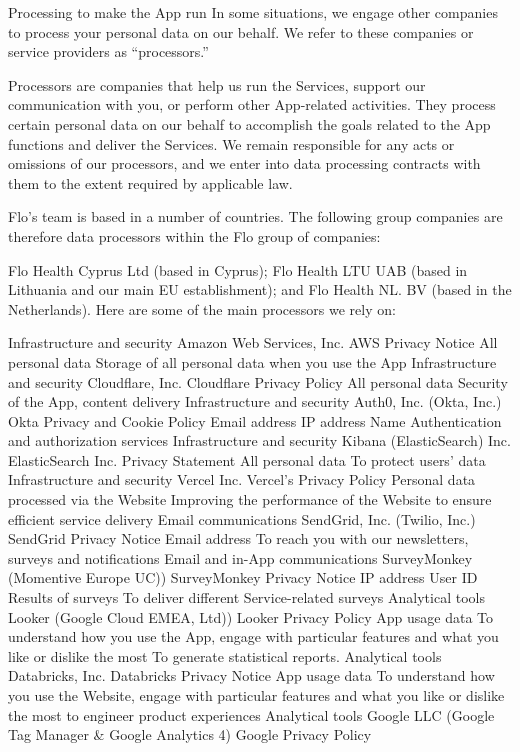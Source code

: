 Processing to make the App run 
In some situations, we engage other companies to process your personal data on our behalf. We refer to these companies or service providers as “processors.” 

Processors are companies that help us run the Services, support our communication with you, or perform other App-related activities. They process certain personal data on our behalf to accomplish the goals related to the App functions and deliver the Services. We remain responsible for any acts or omissions of our processors, and we enter into data processing contracts with them to the extent required by applicable law.

Flo’s team is based in a number of countries. The following group companies are therefore data processors within the Flo group of companies:

Flo Health Cyprus Ltd (based in Cyprus); 
Flo Health LTU UAB (based in Lithuania and our main EU establishment); and 
Flo Health NL. BV (based in the Netherlands).  
Here are some of the main processors we rely on:

Infrastructure and security
Amazon Web Services, Inc. 
AWS Privacy Notice
All personal data
Storage of all personal data when you use the App 
Infrastructure and security
Cloudflare, Inc.
Cloudflare Privacy Policy
All personal data
Security of the App, content delivery
Infrastructure and security
Auth0, Inc. (Okta, Inc.) 
Okta Privacy and Cookie Policy
Email address
IP address
Name
Authentication and authorization services
Infrastructure and security
Kibana (ElasticSearch) Inc.
ElasticSearch Inc. Privacy Statement
All personal data
To protect users’ data 
Infrastructure and security
Vercel Inc. 
Vercel’s Privacy Policy
Personal data processed via the Website
Improving the performance of the Website to ensure efficient service delivery
Email communications
SendGrid, Inc. (Twilio, Inc.)
SendGrid Privacy Notice
Email address
To reach you with our newsletters, surveys and notifications
Email and in-App communications
SurveyMonkey (Momentive Europe UC))
SurveyMonkey Privacy Notice
IP address
User ID
Results of surveys
To deliver different Service-related surveys
Analytical tools
Looker (Google Cloud EMEA, Ltd))
Looker Privacy Policy
App usage data
To understand how you use the App, engage with particular features and what you like or dislike the most
To generate statistical reports. 
Analytical tools
Databricks, Inc.
Databricks Privacy Notice
App usage data
To understand how you use the Website, engage with particular features and what you like or dislike the most to engineer product experiences
Analytical tools
Google LLC (Google Tag Manager & Google Analytics 4) 
Google Privacy Policy

